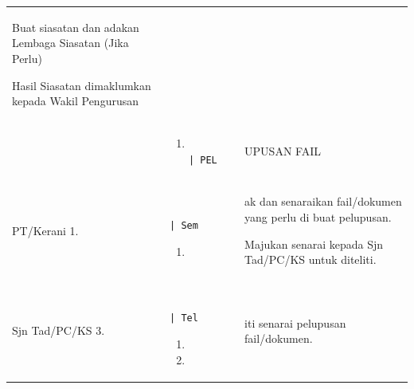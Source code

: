 \documentclass[
]{article}
\begin{document}
\begin{longtable}[]{@{}lll@{}}
\begin{minipage}[t]{0.30\columnwidth}
Buat siasatan dan adakan Lembaga Siasatan (Jika Perlu)

Hasil Siasatan dimaklumkan kepada Wakil Pengurusan\strut
\end{minipage}\tabularnewline
\begin{minipage}[t]{0.30\columnwidth}\raggedright
\strut
\end{minipage} & \begin{minipage}[t]{0.30\columnwidth}\raggedright
\begin{enumerate}
\def\labelenumi{\Alph{enumi}.}
\setcounter{enumi}{4}
\item
\begin{verbatim}
           | PEL
\end{verbatim}
\end{enumerate}\strut
\end{minipage} & \begin{minipage}[t]{0.30\columnwidth}\raggedright
UPUSAN FAIL\strut
\end{minipage}\tabularnewline
\begin{minipage}[t]{0.30\columnwidth}\raggedright
PT/Kerani \textbar{} 1.\strut
\end{minipage} & \begin{minipage}[t]{0.30\columnwidth}\raggedright
\begin{verbatim}
              | Sem
\end{verbatim}

\begin{enumerate}
\def\labelenumi{\arabic{enumi}.}
\setcounter{enumi}{1}
\item
\end{enumerate}\strut
\end{minipage} & \begin{minipage}[t]{0.30\columnwidth}\raggedright
ak dan senaraikan fail/dokumen yang perlu di buat pelupusan.

Majukan senarai kepada Sjn Tad/PC/KS untuk diteliti.\strut
\end{minipage}\tabularnewline
\begin{minipage}[t]{0.30\columnwidth}\raggedright
Sjn Tad/PC/KS \textbar{} 3.\strut
\end{minipage} & \begin{minipage}[t]{0.30\columnwidth}\raggedright
\begin{verbatim}
              | Tel
\end{verbatim}

\begin{enumerate}
\def\labelenumi{\arabic{enumi}.}
\setcounter{enumi}{3}
\item
\item
\end{enumerate}\strut
\end{minipage} & \begin{minipage}[t]{0.30\columnwidth}\raggedright
iti senarai pelupusan fail/dokumen.


\end{minipage}
\end{longtable}
\end{document}
